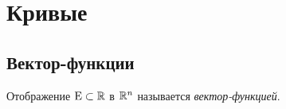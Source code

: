 \section{Кривые}
\subsection{Вектор-функции}
\begin{definition}
    Отображение $\text{E} \subset \mathbb{R}$ в $\mathbb{R}^n$ называется \textit{вектор-функцией}.
\end{definition}